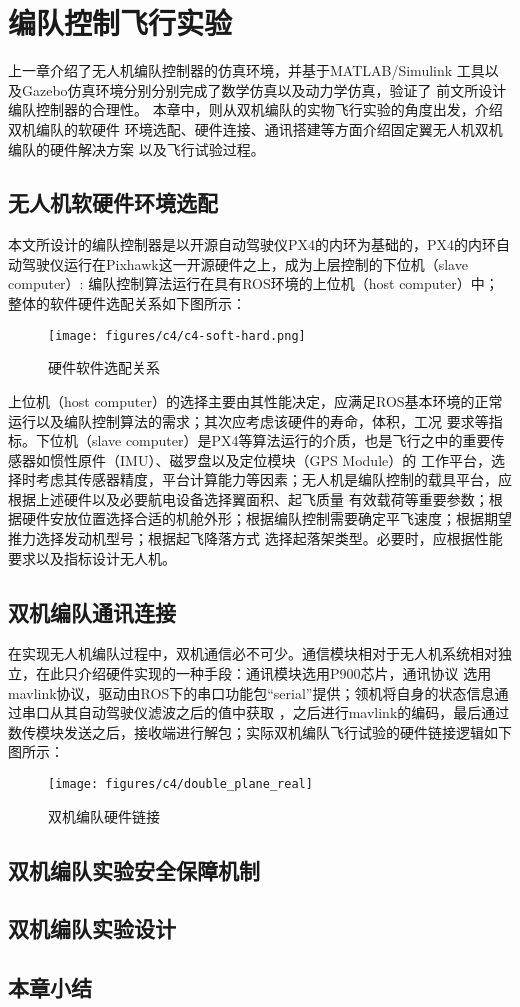\chapter{编队控制飞行实验}%
\label{chap:simulatin_expermient}
上一章介绍了无人机编队控制器的仿真环境，并基于MATLAB/Simulink
工具以及Gazebo仿真环境分别分别完成了数学仿真以及动力学仿真，验证了
前文所设计编队控制器的合理性。
本章中，则从双机编队的实物飞行实验的角度出发，介绍双机编队的软硬件
环境选配、硬件连接、通讯搭建等方面介绍固定翼无人机双机编队的硬件解决方案
以及飞行试验过程。
\section{无人机软硬件环境选配}
本文所设计的编队控制器是以开源自动驾驶仪PX4的内环为基础的，PX4的内环自动驾驶仪运行在Pixhawk这一开源硬件之上，成为上层控制的下位机（slave computer）:
编队控制算法运行在具有ROS环境的上位机（host computer）中；
整体的软件硬件选配关系如下图所示：
\begin{figure}[H]
    \centering
    \texttt{[image: figures/c4/c4-soft-hard.png]}
    \caption{硬件软件选配关系}\label{fig:c4-soft-hard.png}
\end{figure}
上位机（host computer）的选择主要由其性能决定，应满足ROS基本环境的正常运行以及编队控制算法的需求；其次应考虑该硬件的寿命，体积，工况
要求等指标。下位机（slave computer）是PX4等算法运行的介质，也是飞行之中的重要传感器如惯性原件（IMU）、磁罗盘以及定位模块（GPS Module）的
工作平台，选择时考虑其传感器精度，平台计算能力等因素；无人机是编队控制的载具平台，应根据上述硬件以及必要航电设备选择翼面积、起飞质量
有效载荷等重要参数；根据硬件安放位置选择合适的机舱外形；根据编队控制需要确定平飞速度；根据期望推力选择发动机型号；根据起飞降落方式
选择起落架类型。必要时，应根据性能要求以及指标设计无人机。
\section{双机编队通讯连接}
在实现无人机编队过程中，双机通信必不可少。通信模块相对于无人机系统相对独立，在此只介绍硬件实现的一种手段：通讯模块选用P900芯片，通讯协议
选用mavlink协议，驱动由ROS下的串口功能包“serial”提供；领机将自身的状态信息通过串口从其自动驾驶仪滤波之后的值中获取
，之后进行mavlink的编码，最后通过数传模块发送之后，接收端进行解包；实际双机编队飞行试验的硬件链接逻辑如下图所示：
\begin{figure}[H]
    \centering
    \texttt{[image: figures/c4/double\_plane\_real]}
    \caption{双机编队硬件链接}\label{fig:c4-double_plane_real}
\end{figure}
\section{双机编队实验安全保障机制}
\section{双机编队实验设计}
\section{本章小结}
